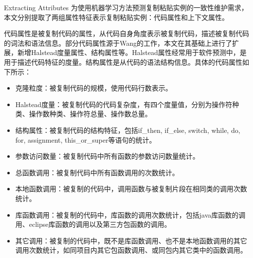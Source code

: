 {Extracting Attributes}
为使用机器学习方法预测复制粘贴实例的一致性维护需求，本文分别提取了两组属性特征表示复制粘贴实例：代码属性和上下文属性。

代码属性是被复制代码的属性，从代码自身角度表示被复制代码，描述被复制代码的词法和语法信息。部分代码属性源于Wang的工作，本文在其基础上进行了扩展，新增Halstead度量属性、结构属性等。Halstead属性经常用于软件预测中，是用于描述代码特征的度量。结构属性是从代码的语法结构信息。具体的代码属性如下所示：
\begin{itemize}
\item 克隆粒度：被复制代码的规模，使用代码行数表示。
\item Halstead度量：被复制代码的代码复杂度，有四个度量值，分别为操作符种类、操作数种类、操作符总量、操作数总量。
\item  结构属性：被复制代码的结构特征，包括if\_then, if\_else, switch, while, do, for, assignment, this\_or\_super等语句的统计。
\item  参数访问数量：被复制代码中所有函数的参数访问数量统计。
\item  总函数调用：被复制代码中所有函数调用的次数统计。
\item  本地函数调用：被复制的代码中，调用函数与被复制片段在相同类的调用次数统计。
\item  库函数调用：被复制的代码中，库函数的调用次数统计，包括java库函数的调用、eclipse库函数的调用以及第三方包函数的调用。
\item  其它调用：被复制的代码中，既不是库函数调用、也不是本地函数调用的其它调用次数统计，如同项目内其它包函数调用、或同包内其它类中的函数调用。
\end{itemize}

